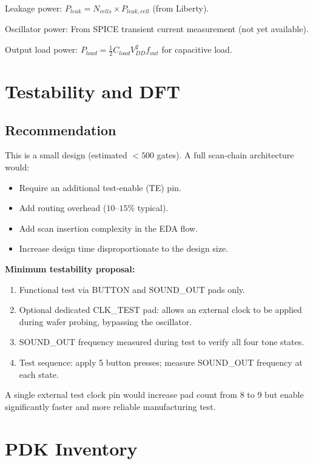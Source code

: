 \documentclass[11pt,a4paper]{article}
\begin{document}
Leakage power: $P_{leak} = N_{cells} \times P_{leak,cell}$ (from Liberty).

Oscillator power: From SPICE transient current measurement (not yet available).

Output load power: $P_{load} = \frac{1}{2} C_{load} V_{DD}^2 f_{out}$ for capacitive load.

\section{Testability and DFT}

\subsection{Recommendation}

This is a small design (estimated $<500$ gates). A full scan-chain architecture would:
\begin{itemize}
  \item Require an additional test-enable (TE) pin.
  \item Add routing overhead ($10$--$15$\% typical).
  \item Add scan insertion complexity in the EDA flow.
  \item Increase design time disproportionate to the design size.
\end{itemize}

\textbf{Minimum testability proposal:}
\begin{enumerate}
  \item Functional test via BUTTON and SOUND\_OUT pads only.
  \item Optional dedicated CLK\_TEST pad: allows an external clock to be applied during
        wafer probing, bypassing the oscillator.
  \item SOUND\_OUT frequency measured during test to verify all four tone states.
  \item Test sequence: apply 5 button presses; measure SOUND\_OUT frequency at each state.
\end{enumerate}

A single external test clock pin would increase pad count from 8 to 9 but enable significantly
faster and more reliable manufacturing test.

\section{PDK Inventory}
\end{document}
